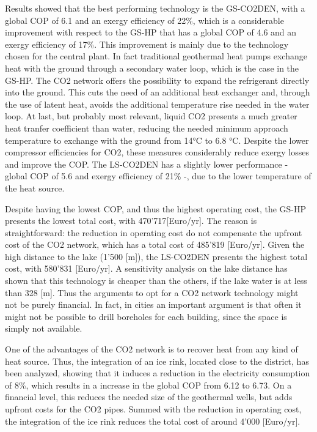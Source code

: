 \documentclass{article}
\begin{document}
Results showed that the best performing technology is the GS-CO2DEN, with a global COP of 6.1 and an exergy efficiency of 22\%, which is a considerable improvement with respect to the GS-HP that has a global COP of 4.6 and an exergy efficiency of 17\%. This improvement is mainly due to the technology chosen for the central plant. In fact traditional geothermal heat pumps exchange heat with the ground through a secondary water loop, which is the case in the GS-HP. The CO2 network offers the possibility to expand the refrigerant directly into the ground. This cuts the need of an additional heat exchanger and, through the use of latent heat, avoids the additional temperature rise needed in the water loop. At last, but probably most relevant, liquid CO2 presents a much greater heat tranfer coefficient than water, reducing the needed minimum approach temperature to exchange with the ground from 14\si{\celsius} to 6.8 \si{\celsius}. Despite the lower compressor efficiencies for CO2, these measures considerably reduce exergy losses and improve the COP. The LS-CO2DEN has a slightly lower performance - global COP of 5.6 and exergy efficiency of 21\% -, due to the lower temperature of the heat source.

Despite having the lowest COP, and thus the highest operating cost, the GS-HP presents the lowest total cost, with 470'717[Euro/yr]. The reason is straightforward: the reduction in operating cost do not compensate the upfront cost of the CO2 network, which has a total cost of 485'819 [Euro/yr]. Given the high distance to the lake (1'500 [m]), the LS-CO2DEN presents the highest total cost, with 580'831 [Euro/yr]. A sensitivity analysis on the lake distance has shown that this technology is cheaper than the others, if the lake water is at less than 328 [m]. Thus the arguments to opt for a CO2 network technology might not be purely financial. In fact, in cities an important argument is that often it might not be possible to drill boreholes for each building, since the space is simply not available.

One of the advantages of the CO2 network is to recover heat from any kind of heat source. Thus, the integration of an ice rink, located close to the district, has been analyzed, showing that it induces a reduction in the electricity consumption of 8\%, which results in a increase in the global COP from 6.12 to 6.73. On a financial level, this reduces the needed size of the geothermal wells, but adds upfront costs for the CO2 pipes. Summed with the reduction in operating cost, the integration of the ice rink reduces the total cost of around 4'000 [Euro/yr].\\
\end{document}
